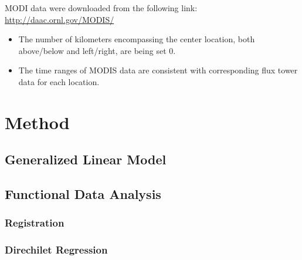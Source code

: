 \documentclass{article}
\begin{document}
MODI data were downloaded from the following link: \url{http://daac.ornl.gov/MODIS/}

\begin{itemize}
\item The number of kilometers encompassing the center location, both above/below and left/right, are being set 0.
\item The time ranges of MODIS data are consistent with corresponding flux tower data for each location.
\end{itemize}

\section{Method}

\subsection{Generalized Linear Model}


\subsection{Functional Data Analysis}


\subsubsection{Registration}


\subsubsection{Direchilet Regression}
\end{document}
